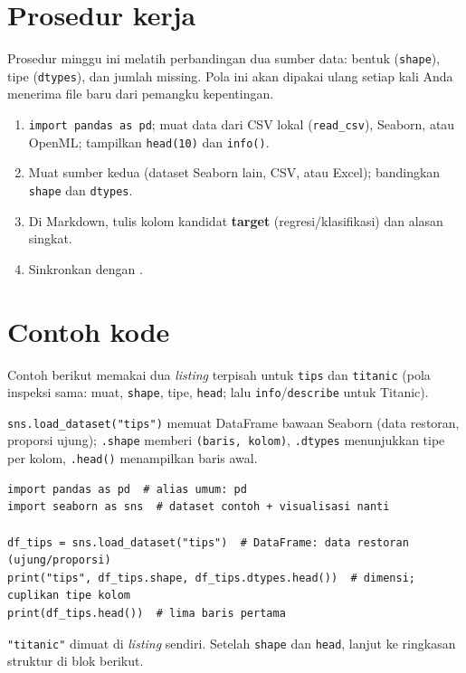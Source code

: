 \documentclass[../main.tex]{subfiles}
\begin{document}
\section{Prosedur kerja}

Prosedur minggu ini melatih perbandingan dua sumber data: bentuk (\texttt{shape}), tipe (\texttt{dtypes}), dan jumlah missing. Pola ini akan dipakai ulang setiap kali Anda menerima file baru dari pemangku kepentingan.

\begin{enumerate}[leftmargin=*]
  \item \texttt{import pandas as pd}; muat data dari CSV lokal (\texttt{read\_csv}), Seaborn, atau OpenML; tampilkan \texttt{head(10)} dan \texttt{info()}.
  \item Muat sumber kedua (dataset Seaborn lain, CSV, atau Excel); bandingkan \texttt{shape} dan \texttt{dtypes}.
  \item Di Markdown, tulis kolom kandidat \textbf{target} (regresi/klasifikasi) dan alasan singkat.
  \item Sinkronkan dengan .
\end{enumerate}

\section{Contoh kode}

Contoh berikut memakai dua \textit{listing} terpisah untuk \texttt{tips} dan \texttt{titanic} (pola inspeksi sama: muat, \texttt{shape}, tipe, \texttt{head}; lalu \texttt{info}/\texttt{describe} untuk Titanic).

\MulaiPenjelasanKode \texttt{sns.load\_dataset("tips")} memuat DataFrame bawaan Seaborn (data restoran, proporsi ujung); \texttt{.shape} memberi \texttt{(baris, kolom)}, \texttt{.dtypes} menunjukkan tipe per kolom, \texttt{.head()} menampilkan baris awal. \SelesaiPenjelasanKode

\begin{lstlisting}[caption=Memuat dan menginspeksi dataset \texttt{tips}]
import pandas as pd  # alias umum: pd
import seaborn as sns  # dataset contoh + visualisasi nanti

df_tips = sns.load_dataset("tips")  # DataFrame: data restoran (ujung/proporsi)
print("tips", df_tips.shape, df_tips.dtypes.head())  # dimensi; cuplikan tipe kolom
print(df_tips.head())  # lima baris pertama
\end{lstlisting}

\MulaiPenjelasanKode \texttt{"titanic"} dimuat di \textit{listing} sendiri. Setelah \texttt{shape} dan \texttt{head}, lanjut ke ringkasan struktur di blok berikut. \SelesaiPenjelasanKode
\end{document}
